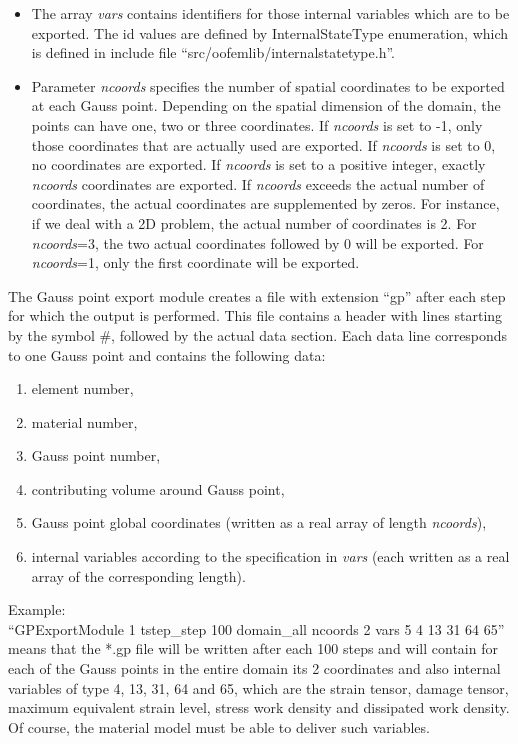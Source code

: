 \documentclass[a4paper]{article}
\newcommand{\param}[1]{{\em #1}}
\begin{document}
\begin{itemize}
\begin{itemize}
\item The array \param{vars} contains identifiers for those internal
variables which are to be exported. The id values are defined by
InternalStateType enumeration, which is defined in include file
``src/oofemlib/internal\-statetype.h''.
\item Parameter \param{ncoords} specifies the number of spatial coordinates to be exported at each Gauss point. Depending on the spatial dimension of the
domain, the points can have one, two or three coordinates. If  \param{ncoords}
is set to -1, only those coordinates that are actually used are exported.
 If  \param{ncoords} is set to 0, no coordinates are exported. 
If  \param{ncoords}
is set to a positive integer, exactly \param{ncoords} coordinates are exported.
If  \param{ncoords} exceeds the actual number of coordinates, the actual
coordinates are supplemented by zeros. For instance, if we deal with a 2D
problem, the actual number of coordinates is 2. For  \param{ncoords}=3,
the two actual coordinates followed by 0 will be exported. 
For  \param{ncoords}=1, only the first coordinate will be exported.
\end{itemize}
The Gauss point export module creates a file with extension ``gp''
after each step for which the output is performed. This file contains
a header with lines starting by the symbol \#, followed by the actual data
section.
Each data line corresponds to one Gauss point and contains the following
data: 
\begin{enumerate}
\item element number,
 \item    material number,
 \item     Gauss point number,
  \item   contributing volume around Gauss point,
\item Gauss point global coordinates (written as a real array of length \param{ncoords}),
\item internal variables according to the specification in \param{vars} (each written as a real array of the corresponding length).
\end{enumerate}
Example:\\ 
``GPExportModule 1 tstep\_step 100 domain\_all ncoords 2 vars 5 4 13 31 64 65''
\\
means that the *.gp file will be written after each 100 steps and will contain
for each of the Gauss points in the entire domain its 2 coordinates and also internal
variables of type 4, 13, 31, 64 and 65, which are the strain tensor, damage tensor, maximum equivalent strain level, stress work density and dissipated work density. Of course, the material model must be able to deliver such variables. 

\end{itemize}
\end{document}
